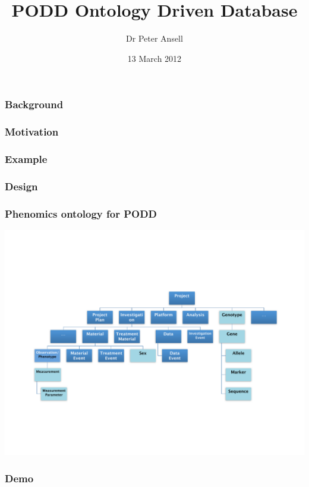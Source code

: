 \documentclass[12pt]{beamer}
\title{PODD Ontology Driven Database}
\author{Dr Peter Ansell}
\institute{University of Queensland}
\date{13 March 2012}
\begin{document}
\begin{frame}
\titlepage
\end{frame}


\begin{frame}
\frametitle{Background} 

\end{frame}

\begin{frame}
\frametitle{Motivation} 

\end{frame}

\begin{frame}
\frametitle{Example} 

\end{frame}

\begin{frame}
\frametitle{Design} 

\end{frame}

\begin{frame}[t]
\frametitle{Phenomics ontology for PODD}
\invisible

\begin{center}
 \includegraphics[scale=0.36,keepaspectratio=true]{./podd_ont.pdf}
\end{center}
\end{frame}

\begin{frame}
\frametitle{Demo} 

\end{frame}
\end{document}
